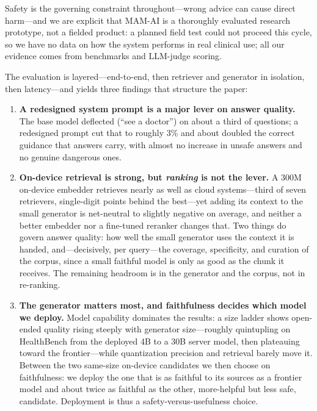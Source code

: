 Safety is the governing constraint throughout---wrong advice can cause direct
harm---and we are explicit that MAM-AI is a thoroughly evaluated research
prototype, not a fielded product: a planned field test could not proceed this
cycle, so we have no data on how the system performs in real clinical use;
all our evidence comes from benchmarks and LLM-judge scoring.

The evaluation is layered---end-to-end, then retriever and generator in
isolation, then latency---and yields three findings that structure the paper:

\begin{enumerate}
  \item \textbf{A redesigned system prompt is a major lever on answer
  quality.} The base model deflected (``see a doctor'') on about a third of
  questions; a redesigned prompt cut that to roughly 3\% and about doubled the
  correct guidance that answers carry, with almost no increase in unsafe
  answers and no genuine dangerous ones.

  \item \textbf{On-device retrieval is strong, but \emph{ranking} is not the
  lever.} A 300M on-device embedder retrieves nearly as well as cloud
  systems---third of seven retrievers, single-digit points behind the best---yet
  adding its context to the small generator is net-neutral to slightly
  negative on average, and neither a better embedder nor a fine-tuned reranker
  changes that. Two things do govern answer quality: how well the small
  generator uses the context it is handed, and---decisively, per query---the
  coverage, specificity, and curation of the corpus, since a small faithful
  model is only as good as the chunk it receives. The remaining headroom is in
  the generator and the corpus, not in re-ranking.

  \item \textbf{The generator matters most, and faithfulness decides which
  model we deploy.} Model capability dominates the results: a size ladder shows
  open-ended quality rising steeply with generator size---roughly quintupling
  on HealthBench from the deployed 4B to a 30B server model, then plateauing
  toward the frontier---while quantization precision and retrieval barely move
  it. Between the two same-size on-device candidates we then choose on
  faithfulness: we deploy the one that is as faithful to its sources as a
  frontier model and about twice as faithful as the other, more-helpful but
  less safe, candidate. Deployment is thus a safety-versus-usefulness choice.
\end{enumerate}

